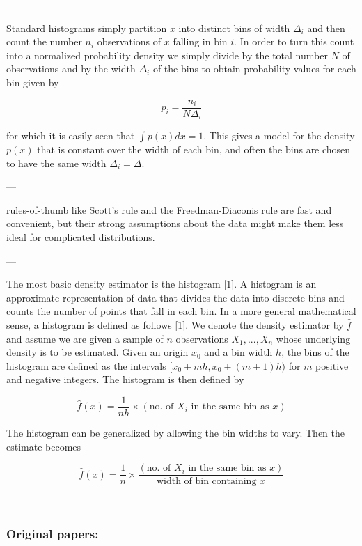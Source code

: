 --- 

Standard histograms simply partition $x$ into distinct bins of width $\Delta_i$ and then count the number $n_i$ observations of $x$ falling in bin $i$. In order to turn this count into a normalized probability density we simply divide by the total number $N$ of observations and by the width $\Delta_i$ of the bins to obtain probability values for each bin given by 

$$ p_i = \frac{n_i}{N \Delta_i}$$ 

for which it is easily seen that $\int p(x) dx = 1$. This gives a model for the density $p(x)$ that is constant over the width of each bin, and often the bins are chosen to have the same width $\Delta_i = \Delta$.


---

rules-of-thumb like Scott’s rule and the Freedman-Diaconis rule are fast and convenient, but their strong assumptions about the data might make them less ideal for complicated distributions. 

---

The most basic density estimator is the histogram [1]. A histogram is an approximate representation of data that divides the data into discrete bins and counts the number of points that fall in each bin. In a more general mathematical sense, a histogram is defined as follows [1]. We denote the density estimator by $\hat{f}$ and assume we are given a sample of $n$ observations $X_1, ..., X_n$ whose underlying density is to be estimated. Given an origin $x_0$ and a bin width $h$, the bins of the histogram are defined as the intervals $[x_0 + mh, x_0 + (m+1)h)$ for $m$ positive and negative integers. The histogram is then defined by

\begin{equation*}
    \hat{f}(x) = \frac{1}{nh} \times (\text{no. of } X_i \text{ in the same bin as } x)
\end{equation*}

The histogram can be generalized by allowing the bin widths to vary. Then the estimate becomes 

\begin{equation*}
    \hat{f}(x) = \frac{1}{n} \times \frac{(\text{no. of } X_i \text{ in the same bin as } x)}{\text{width of bin containing }x}
\end{equation*}


---


\subsubsection*{Original papers:} 

